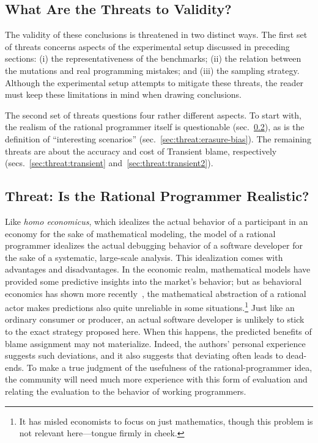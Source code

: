 \subsection{What Are the Threats to Validity?}

The validity of these conclusions is threatened in two distinct ways. The first
set of threats concerns aspects of the experimental setup discussed in preceding
sections: (i) the representativeness of the benchmarks; (ii) the relation between the
mutations and real programming mistakes; and (iii) the sampling strategy.
Although the experimental setup attempts to mitigate these threats, the
reader must keep these limitations in mind when drawing conclusions.

The second set of threats questions four rather different aspects. To start
with, the realism of the rational programmer itself is questionable
(sec.~\ref{sub:rational}), as is the definition of ``interesting scenarios''
(sec.~\ref{sec:threat:erasure-bias}).  The remaining threats are about the
accuracy and cost of Transient blame, respectively
(secs.~\ref{sec:threat:transient} and~\ref{sec:threat:transient2}).

\subsection{Threat: Is the Rational Programmer Realistic?} \label{sub:rational}

Like {\em homo economicus\/}, which idealizes the actual behavior of a
participant in an economy for the sake of mathematical modeling, the model of a
rational programmer idealizes the actual debugging behavior of a software
developer for the sake of a systematic, large-scale analysis. This idealization 
comes with advantages and disadvantages. In the economic realm, mathematical
models have provided some predictive insights into the market's behavior; but as
behavioral economics has shown more recently~\cite{henrich2001search},
the mathematical abstraction of a
rational actor makes predictions also quite unreliable in some situations.\footnote{It
has misled economists to focus on just mathematics, though
this problem is not relevant here---tongue firmly in cheek.}  Just like an
ordinary consumer or producer, an actual software developer is unlikely to stick
to the exact strategy proposed here. When this happens, the predicted benefits
of blame assignment may not materialize. Indeed, the authors' personal
experience suggests such deviations, and it also suggests that deviating often leads to dead-ends.
To make a true judgment of the usefulness of the rational-programmer
idea, the community will need much more experience with this form of evaluation
and relating the evaluation to the behavior of working programmers.

